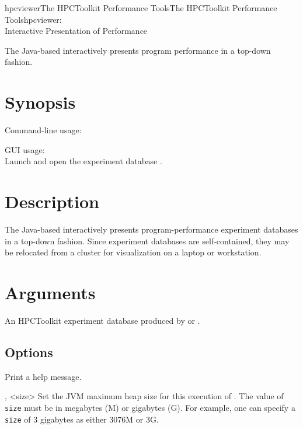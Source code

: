 \documentclass[english]{article}
\begin{document}
\begin{Name}{1}{hpcviewer}{The HPCToolkit Performance Tools}{The HPCToolkit Performance Tools}{hpcviewer:\\ Interactive Presentation of Performance}

The Java-based  interactively presents program performance in a top-down fashion.

\end{Name}

\section{Synopsis}

Command-line usage:\\
\SP\SP\SP{}  

GUI usage:\\
\SP\SP\SP Launch  and open the experiment database .


\section{Description}

The Java-based  interactively presents program-performance experiment databases
in a top-down fashion.
Since experiment databases are self-contained,
they may be relocated from a cluster for visualization on a laptop or workstation.

\section{Arguments}

\begin{Description}
\item[\Arg{hpctoolkit-database}] An HPCToolkit experiment database
produced by  or .
\end{Description}


\subsection{Options}

\begin{Description}

\item[\Opt{-h} \Opt{--help}]
Print a help message.


\item[\Opt{-jh}, \Opt{--java-heap} <size>]
  	Set the JVM maximum heap size for this execution of  . The value of \texttt{size} must be 
	in megabytes (M) or gigabytes (G). For example, one can specify a \texttt{size}  of 3 gigabytes as either 
	3076M or 3G.


\end{Description}
\end{document}
